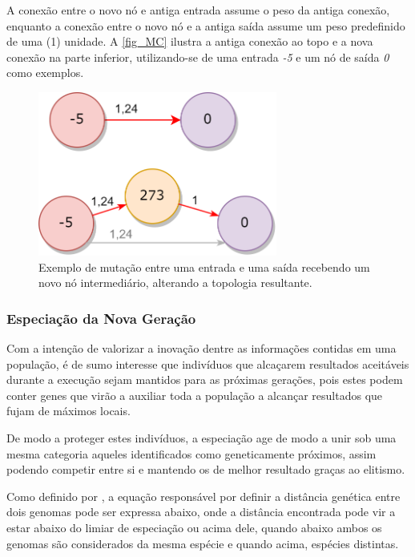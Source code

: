 A conexão entre o novo nó e antiga entrada assume o peso da antiga conexão, enquanto a
conexão entre o novo nó e a antiga saída assume um peso predefinido de uma (1) unidade.
A \autoref{fig_MC} ilustra a antiga conexão ao topo e a nova conexão na parte inferior,
utilizando-se de uma entrada \textit{-5} e um nó de saída \textit{0} como exemplos.

\begin{figure}[htb]
        \centering
        \caption{\label{fig_MC}Exemplo de mutação entre uma entrada e uma saída recebendo um novo nó intermediário, alterando a topologia resultante.}
        \includegraphics[width=0.7\textwidth]{images/MC.png}
\end{figure}

\subsubsection{Especiação da Nova Geração}
Com a intenção de valorizar a inovação dentre as informações contidas em uma população, é de sumo interesse
que indivíduos que alcaçarem resultados aceitáveis durante a execução sejam mantidos para as próximas gerações,
pois estes podem conter genes que virão a auxiliar toda a população a alcançar resultados que fujam de máximos locais.

De modo a proteger estes indivíduos, a especiação age de modo a unir sob uma mesma categoria aqueles
identificados como geneticamente próximos, assim podendo competir entre si e mantendo os de melhor resultado graças ao elitismo.

Como definido por , a equação responsável por definir a
distância genética entre dois genomas pode ser expressa abaixo, onde a distância  encontrada
pode vir a estar abaixo do limiar de especiação ou acima dele, quando abaixo ambos os genomas
são considerados da mesma espécie e quando acima, espécies distintas.

